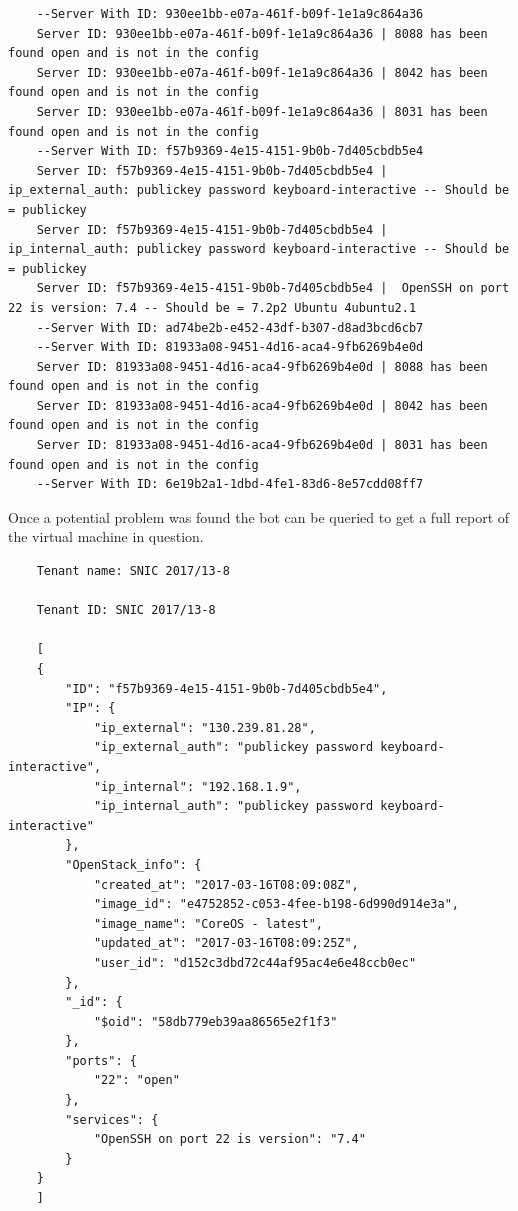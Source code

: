 \documentclass[12pt]{article}
\begin{document}
\begin{lstlisting}
    --Server With ID: 930ee1bb-e07a-461f-b09f-1e1a9c864a36
    Server ID: 930ee1bb-e07a-461f-b09f-1e1a9c864a36 | 8088 has been found open and is not in the config
    Server ID: 930ee1bb-e07a-461f-b09f-1e1a9c864a36 | 8042 has been found open and is not in the config
    Server ID: 930ee1bb-e07a-461f-b09f-1e1a9c864a36 | 8031 has been found open and is not in the config
    --Server With ID: f57b9369-4e15-4151-9b0b-7d405cbdb5e4
    Server ID: f57b9369-4e15-4151-9b0b-7d405cbdb5e4 |  ip_external_auth: publickey password keyboard-interactive -- Should be = publickey
    Server ID: f57b9369-4e15-4151-9b0b-7d405cbdb5e4 |  ip_internal_auth: publickey password keyboard-interactive -- Should be = publickey
    Server ID: f57b9369-4e15-4151-9b0b-7d405cbdb5e4 |  OpenSSH on port 22 is version: 7.4 -- Should be = 7.2p2 Ubuntu 4ubuntu2.1
    --Server With ID: ad74be2b-e452-43df-b307-d8ad3bcd6cb7
    --Server With ID: 81933a08-9451-4d16-aca4-9fb6269b4e0d
    Server ID: 81933a08-9451-4d16-aca4-9fb6269b4e0d | 8088 has been found open and is not in the config
    Server ID: 81933a08-9451-4d16-aca4-9fb6269b4e0d | 8042 has been found open and is not in the config
    Server ID: 81933a08-9451-4d16-aca4-9fb6269b4e0d | 8031 has been found open and is not in the config
    --Server With ID: 6e19b2a1-1dbd-4fe1-83d6-8e57cdd08ff7
\end{lstlisting}

Once a potential problem was found the bot can be queried to get a full report of the virtual machine in question.

\begin{lstlisting}
    Tenant name: SNIC 2017/13-8

    Tenant ID: SNIC 2017/13-8

    [
    {
        "ID": "f57b9369-4e15-4151-9b0b-7d405cbdb5e4",
        "IP": {
            "ip_external": "130.239.81.28",
            "ip_external_auth": "publickey password keyboard-interactive",
            "ip_internal": "192.168.1.9",
            "ip_internal_auth": "publickey password keyboard-interactive"
        },
        "OpenStack_info": {
            "created_at": "2017-03-16T08:09:08Z",
            "image_id": "e4752852-c053-4fee-b198-6d990d914e3a",
            "image_name": "CoreOS - latest",
            "updated_at": "2017-03-16T08:09:25Z",
            "user_id": "d152c3dbd72c44af95ac4e6e48ccb0ec"
        },
        "_id": {
            "$oid": "58db779eb39aa86565e2f1f3"
        },
        "ports": {
            "22": "open"
        },
        "services": {
            "OpenSSH on port 22 is version": "7.4"
        }
    }
    ]
\end{lstlisting}
\end{document}
